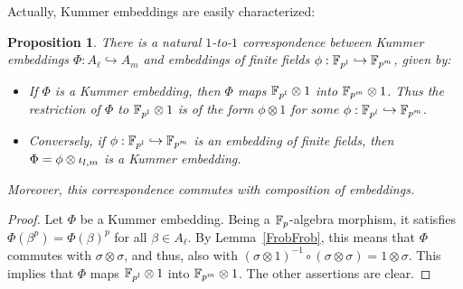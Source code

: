 \documentclass[sigconf]{acmart}
\newtheorem{proposition}[theorem]{Proposition}
\begin{document}
Actually, Kummer embeddings are easily characterized:
\begin{proposition}
\label{Phiphi}
There is a natural $1$-to-$1$ correspondence between Kummer embeddings $\Phi:A_\ell\hookrightarrow A_m$
and embeddings of finite fields $\phi:\mathbb{F}_{p^l}\hookrightarrow\mathbb{F}_{p^m}$, given by:
\begin{itemize}
\item If $\Phi$ is a Kummer embedding, then $\Phi$ maps $\mathbb{F}_{p^l}\otimes1$ into $\mathbb{F}_{p^m}\otimes 1$.
Thus the restriction of $\Phi$ to $\mathbb{F}_{p^l}\otimes1$ is of the form $\phi\otimes1$ for some $\phi:\mathbb{F}_{p^l}\hookrightarrow\mathbb{F}_{p^m}$.
\item Conversely, if $\phi:\mathbb{F}_{p^l}\hookrightarrow\mathbb{F}_{p^m}$ is an embedding of finite fields, then $\Phi=\phi\otimes{\iota_{{l},{m}}}$
is a Kummer embedding.
\end{itemize}
Moreover, this correspondence commutes with composition of embeddings.
\end{proposition}
\begin{proof}
Let $\Phi$ be a Kummer embedding. Being a $\mathbb{F}_{p}$-algebra morphism, it satisfies $\Phi(\beta^p)=\Phi(\beta)^p$ for all $\beta\in A_\ell$.
By Lemma~\ref{FrobFrob}, this means that $\Phi$ commutes with $\sigma\otimes\sigma$, and thus,
also with $(\sigma\otimes 1)^{-1}\circ(\sigma\otimes\sigma)=1\otimes\sigma$.
This implies that $\Phi$ maps $\mathbb{F}_{p^l}\otimes1$ into $\mathbb{F}_{p^m}\otimes 1$.
The other assertions are clear.
\end{proof}
\end{document}
